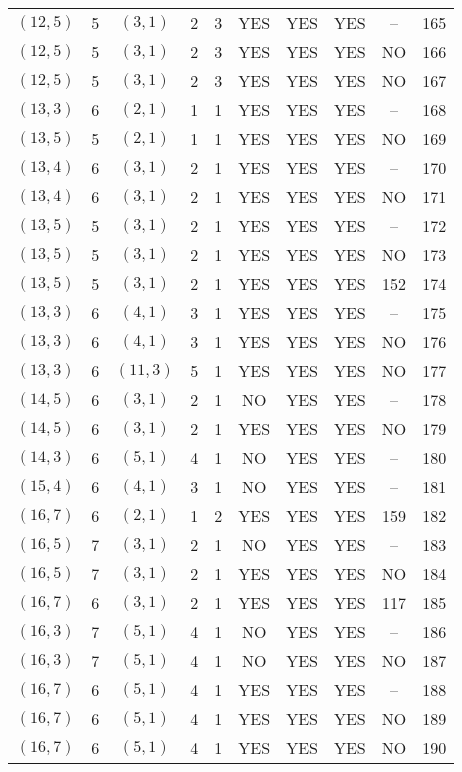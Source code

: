 \begin{longtable}{|c|c|c|c|c|c|c|c|c|c|}
$(12, 5)$ & 5 & $(3, 1)$ & 2 & 3 & YES & YES & YES & -- & 165\\
$(12, 5)$ & 5 & $(3, 1)$ & 2 & 3 & YES & YES & YES & NO & 166\\
$(12, 5)$ & 5 & $(3, 1)$ & 2 & 3 & YES & YES & YES & NO & 167\\
$(13, 3)$ & 6 & $(2, 1)$ & 1 & 1 & YES & YES & YES & -- & 168\\
$(13, 5)$ & 5 & $(2, 1)$ & 1 & 1 & YES & YES & YES & NO & 169\\
$(13, 4)$ & 6 & $(3, 1)$ & 2 & 1 & YES & YES & YES & -- & 170\\
$(13, 4)$ & 6 & $(3, 1)$ & 2 & 1 & YES & YES & YES & NO & 171\\
$(13, 5)$ & 5 & $(3, 1)$ & 2 & 1 & YES & YES & YES & -- & 172\\
$(13, 5)$ & 5 & $(3, 1)$ & 2 & 1 & YES & YES & YES & NO & 173\\
$(13, 5)$ & 5 & $(3, 1)$ & 2 & 1 & YES & YES & YES & 152 & 174\\
$(13, 3)$ & 6 & $(4, 1)$ & 3 & 1 & YES & YES & YES & -- & 175\\
$(13, 3)$ & 6 & $(4, 1)$ & 3 & 1 & YES & YES & YES & NO & 176\\
$(13, 3)$ & 6 & $(11, 3)$ & 5 & 1 & YES & YES & YES & NO & 177\\
$(14, 5)$ & 6 & $(3, 1)$ & 2 & 1 & NO & YES & YES & -- & 178\\
$(14, 5)$ & 6 & $(3, 1)$ & 2 & 1 & YES & YES & YES & NO & 179\\
$(14, 3)$ & 6 & $(5, 1)$ & 4 & 1 & NO & YES & YES & -- & 180\\
$(15, 4)$ & 6 & $(4, 1)$ & 3 & 1 & NO & YES & YES & -- & 181\\
$(16, 7)$ & 6 & $(2, 1)$ & 1 & 2 & YES & YES & YES & 159 & 182\\
$(16, 5)$ & 7 & $(3, 1)$ & 2 & 1 & NO & YES & YES & -- & 183\\
$(16, 5)$ & 7 & $(3, 1)$ & 2 & 1 & YES & YES & YES & NO & 184\\
$(16, 7)$ & 6 & $(3, 1)$ & 2 & 1 & YES & YES & YES & 117 & 185\\
$(16, 3)$ & 7 & $(5, 1)$ & 4 & 1 & NO & YES & YES & -- & 186\\
$(16, 3)$ & 7 & $(5, 1)$ & 4 & 1 & NO & YES & YES & NO & 187\\
$(16, 7)$ & 6 & $(5, 1)$ & 4 & 1 & YES & YES & YES & -- & 188\\
$(16, 7)$ & 6 & $(5, 1)$ & 4 & 1 & YES & YES & YES & NO & 189\\
$(16, 7)$ & 6 & $(5, 1)$ & 4 & 1 & YES & YES & YES & NO & 190\\

\end{longtable}
